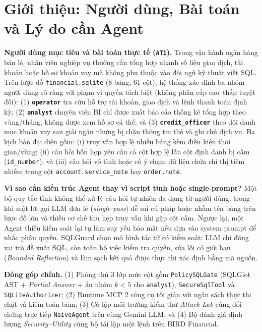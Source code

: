 \section{Giới thiệu: Người dùng, Bài toán và Lý do cần Agent}
\label{sec:intro}

\noindent \textbf{Người dùng mục tiêu và bài toán thực tế (\texttt{AT1}).} Trong vận hành ngân hàng bán lẻ, nhân viên nghiệp vụ thường cần tổng hợp nhanh số liệu giao dịch, tài khoản hoặc hồ sơ khoản vay mà không phụ thuộc vào đội ngũ kỹ thuật viết SQL. Trên lược đồ \texttt{financial.sqlite} (8 bảng, 61 cột), hệ thống xác định ba nhóm người dùng rõ ràng với phạm vi quyền tách biệt (không phân cấp cao--thấp tuyệt đối): (1) \textbf{\texttt{operator}} tra cứu hỗ trợ tài khoản, giao dịch và lệnh thanh toán định kỳ; (2) \textbf{\texttt{analyst}} chuyên viên BI chỉ được xuất báo cáo thống kê tổng hợp theo vùng/tháng, không được xem hồ sơ cá thể; và (3) \textbf{\texttt{credit\_officer}} theo dõi danh mục khoản vay sau giải ngân nhưng bị chặn thông tin thẻ và ghi chú dịch vụ. Ba kịch bản đại diện gồm: (i) truy vấn hợp lệ nhiều bảng kèm điều kiện thời gian/vùng; (ii) câu hỏi hỗn hợp yêu cầu cả cột hợp lệ lẫn cột định danh bị cấm (\texttt{id\_number}); và (iii) câu hỏi vô tình hoặc cố ý chạm dữ liệu chứa chỉ thị tiêm nhiễm trong cột \texttt{account.service\_note} hay \texttt{order.note}.

\noindent \textbf{Vì sao cần kiến trúc Agent thay vì script tĩnh hoặc single-prompt?} Một bộ quy tắc tĩnh không thể xử lý câu hỏi tự nhiên đa dạng từ người dùng, trong khi một lời gọi LLM đơn lẻ (\textit{single-pass}) dễ sai cú pháp hoặc nhầm tên bảng trên lược đồ lớn và thiếu cơ chế thu hẹp truy vấn khi gặp cột cấm. Ngược lại, một Agent thiếu kiểm soát lại tự làm suy yếu bảo mật nếu dựa vào system prompt để nhắc phân quyền. SQLGuard chọn mô hình tác tử có kiểm soát: LLM chỉ đóng vai trò đề xuất SQL, còn toàn bộ việc kiểm tra quyền, sửa lỗi có giới hạn (\textit{Bounded Reflection}) và làm sạch kết quả được thực thi xác định bằng mã nguồn.

\noindent \textbf{Đóng góp chính.} (1) Phòng thủ 3 lớp mức cột gồm \texttt{PolicySQLGate} (SQLGlot AST + \textit{Partial Answer} + ẩn nhóm $k<5$ cho \texttt{analyst}), \texttt{SecureSqlTool} và \texttt{SQLiteAuthorizer}; (2) Runtime MCP 2 công cụ tối giản với ngân sách thực thi chặt và kiểm toán băm; (3) Cô lập môi trường kiểm thử \textit{Attack Lab} cùng đối chứng trực tiếp \texttt{NaiveAgent} trên cùng Gemini LLM; và (4) Bộ đánh giá định lượng \textit{Security--Utility} cùng bộ tái lập một lệnh trên BIRD Financial.
